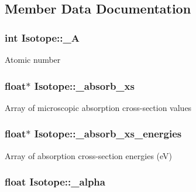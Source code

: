 \subsection{Member Data Documentation}
\hypertarget{classIsotope_a85a7058c3057f880e015791c460f7c29}{
\subsubsection[{\-\_\-\-A}]{\setlength{\rightskip}{0pt plus 5cm}int Isotope\-::\-\_\-\-A\hspace{0.3cm}{\ttfamily [private]}}}\label{classIsotope_a85a7058c3057f880e015791c460f7c29}
Atomic number \hypertarget{classIsotope_a5e2b7ab969ffd103532c60af032436a0}{
\subsubsection[{\-\_\-absorb\-\_\-xs}]{\setlength{\rightskip}{0pt plus 5cm}float$\ast$ Isotope\-::\-\_\-absorb\-\_\-xs\hspace{0.3cm}{\ttfamily [private]}}}\label{classIsotope_a5e2b7ab969ffd103532c60af032436a0}
Array of microscopic absorption cross-\/section values \hypertarget{classIsotope_a151aab960bd2cee02c2eb665d09f2da8}{
\subsubsection[{\-\_\-absorb\-\_\-xs\-\_\-energies}]{\setlength{\rightskip}{0pt plus 5cm}float$\ast$ Isotope\-::\-\_\-absorb\-\_\-xs\-\_\-energies\hspace{0.3cm}{\ttfamily [private]}}}\label{classIsotope_a151aab960bd2cee02c2eb665d09f2da8}
Array of absorption cross-\/section energies (e\-V) \hypertarget{classIsotope_af69f520a6f93928f245e075bc943cc75}{
\subsubsection[{\-\_\-alpha}]{\setlength{\rightskip}{0pt plus 5cm}float Isotope\-::\-\_\-alpha\hspace{0.3cm}{\ttfamily [private]}}}\label{classIsotope_af69f520a6f93928f245e075bc943cc75}
